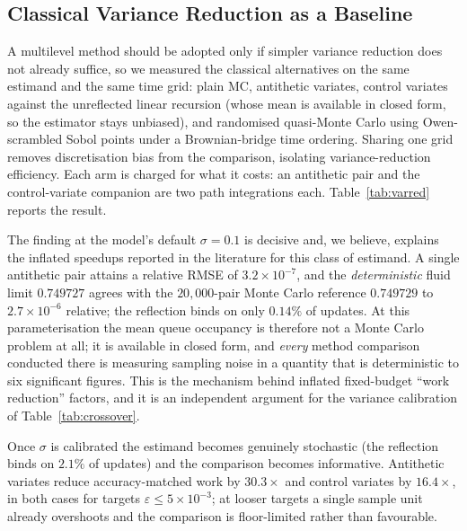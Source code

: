 \documentclass{ieeeaccess}
\begin{document}
\subsection{Classical Variance Reduction as a Baseline}
\label{subsec:varred}

A multilevel method should be adopted only if simpler variance reduction does not already
suffice, so we measured the classical alternatives on the same estimand and the same time grid:
plain MC, antithetic variates, control variates against the unreflected linear recursion (whose
mean is available in closed form, so the estimator stays unbiased), and randomised
quasi-Monte Carlo using Owen-scrambled Sobol points under a Brownian-bridge time ordering.
Sharing one grid removes discretisation bias from the comparison, isolating variance-reduction
efficiency. Each arm is charged for what it costs: an antithetic pair and the control-variate
companion are two path integrations each. Table~\ref{tab:varred} reports the result.

The finding at the model's default $\sigma{=}0.1$ is decisive and, we believe, explains the
inflated speedups reported in the literature for this class of estimand. A single antithetic
pair attains a relative RMSE of $3.2\times10^{-7}$, and the \emph{deterministic} fluid limit
$0.749727$ agrees with the $20{,}000$-pair Monte Carlo reference $0.749729$ to
$2.7\times10^{-6}$ relative; the reflection binds on only $0.14\%$ of updates. At this
parameterisation the mean queue occupancy is therefore not a Monte Carlo problem at all; it is
available in closed form, and \emph{every} method comparison conducted there is measuring
sampling noise in a quantity that is deterministic to six significant figures. This is the
mechanism behind inflated fixed-budget ``work reduction'' factors, and it is an independent
argument for the variance calibration of Table~\ref{tab:crossover}.

Once $\sigma$ is calibrated the estimand becomes genuinely stochastic (the reflection binds on
$2.1\%$ of updates) and the comparison becomes informative. Antithetic variates reduce
accuracy-matched work by $30.3\times$ and control variates by $16.4\times$, in both cases for
targets $\varepsilon\leq5\times10^{-3}$; at looser targets a single sample unit already
overshoots and the comparison is floor-limited rather than favourable.
\end{document}
